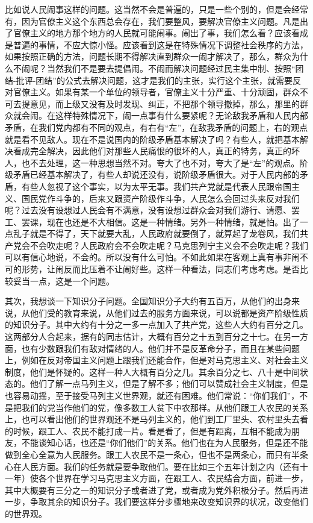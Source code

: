 比如说人民闹事这样的问题。这当然不会是普遍的，只是一些个别的，但是会经常有，因为官僚主义这个东西总会存在，我们要整风，要解决官僚主义问题。凡是出了官僚主义的地方那个地方的人民就可能闹事。闹出了事，我们怎么看？应该看成是普遍的事情，不应大惊小怪。应该看到这是在特殊情况下调整社会秩序的方法，如果按照正确的方法，问题长期不得解决直到群众一闹才解决了，那么，群众为什么不闹呢？当然我们不是要去提倡闹。不闹而解决问题经过民主集中制、按照“团结-批评-团结”的公式去解决问题，这才是我们的主张，实行这个主张，就需要反对官僚主义。如果有某一个单位的领导者，官僚主义十分严重、十分顽固，群众不可去提意见，而上级又没有及时发现、纠正，不把那个领导撤掉，那么，那里的群众就会闹。在这样特殊情况下，闹一点事有什么要紧呢？无论敌我矛盾和人民内部矛盾，在我们党内都有不同的观点，有右有“左”，在敌我矛盾的问题上，右的观点就是看不见敌人。现在不是说国内的阶级矛盾基本解决了吗？有些人，就把基本解决看成完全解决，因此他们对那些人民痛恨的很坏的人，真正的特务，真正的坏人，也不去处理，这一种思想当然不对。夸大了也不对，夸大了是“左”的观点。阶级矛盾已经基本解决了，有些人却说还没有，说阶级矛盾很大。对于人民内部的矛盾，有些人忽视了这个事实，以为太平无事。我们共产党就是代表人民跟帝国主义、国民党作斗争的，后来又跟资产阶级作斗争，人民怎么会回过头来反对我们呢？过去没有设想过人民会有不满意，没有设想过群众会对我们游行、请愿、罢工、罢课，现在也还是不大相信。这是一种情绪。另外一种情绪，就是怕。出了一点乱子就是不得了，天下就要大乱，人民政府就要倒了，就算起了龙卷风，我们共产党会不会吹走呢？人民政府会不会吹走呢？马克思列宁主义会不会吹走呢？我们可以有信心地说，不会的。所以没有什么可怕。不如此如果在客观上真有事非闹不可的形势，让闹反而比压着不让闹好些。这样一种看法，同志们考虑考虑。是否比较妥当一点，这是一个问题。

其次，我想谈一下知识分子问题。全国知识分子大约有五百万，从他们的出身来说，从他们受的教育来说，从他们过去的服务方面来说，可以说都是资产阶级性质的知识分子。其中大约有十分之一多一点加入了共产党，这些人大约有百分之几。这两部分人合起来，据有的同志估计，大概有百分之十五到百分之十七。在另一方面，也有少数跟我们有敌对情绪的人。他们并不是反革命分子，而且在某些问题上，例如在反对帝国主义问题上跟我们还能合作，但是对马克思主义、对社会主义制度，他们是怀疑的。这样一种人大概有百分之几。其余百分之七、八十是中间状态的。他们了解一点马列主义，但是了解不多；他们可以赞成社会主义制度，但是也容易动摇，至于接受马列主义世界观，就还有困难。他们常说：“你们我们”，不是把我们的党当作他们的党，像多数工人贫下中农那样。从他们跟工人农民的关系上，也可以看出他们的世界观还不是马列主义的，他们到工厂里头、农村里头去看的时候，跟工人、农民不能打成一片。看是看了，但是有距离，互相不能成为朋友，不能谈知心话，也还是“你们他们”的关系。他们也在为人民服务，但是还不能做到全心全意为人民服务。跟工人农民不是一条心，但也不是两条心，而只有半条心在人民方面。我们的任务就是要争取他们。要在比如三个五年计划之内（还有十一年）使各个世界在学习马克思主义方面，在跟工人、农民结合方面，前进一步，其中大概要有三分之一的知识分子或者进了党，或者成为党外积极分子。然后再进一步，争取其余的知识分子。我们要这样分步骤地来改变知识界的状况，改变他们的世界观。

